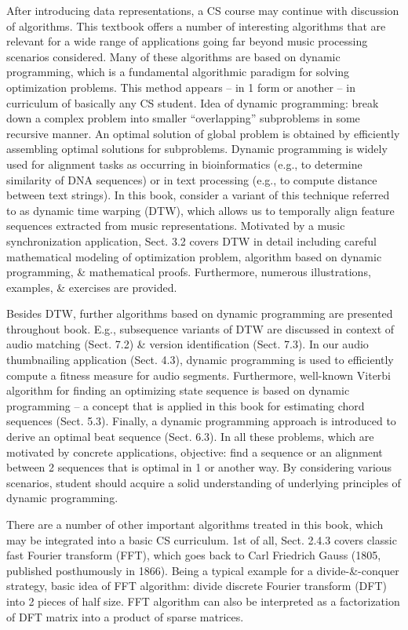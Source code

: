 \documentclass{article}
\begin{document}
\begin{itemize}
\begin{itemize}
		After introducing data representations, a CS course may continue with discussion of algorithms. This textbook offers a number of interesting algorithms that are relevant for a wide range of applications going far beyond music processing scenarios considered. Many of these algorithms are based on dynamic programming, which is a fundamental algorithmic paradigm for solving optimization problems. This method appears -- in 1 form or another -- in curriculum of basically any CS student. Idea of dynamic programming: break down a complex problem into smaller ``overlapping'' subproblems in some recursive manner. An optimal solution of global problem is obtained by efficiently assembling optimal solutions for subproblems. Dynamic programming is widely used for alignment tasks as occurring in bioinformatics (e.g., to determine similarity of DNA sequences) or in text processing (e.g., to compute distance between text strings). In this book, consider a variant of this technique referred to as dynamic time warping (DTW), which allows us to temporally align feature sequences extracted from music representations. Motivated by a music synchronization application, Sect. 3.2 covers DTW in detail including careful mathematical modeling of optimization problem, algorithm based on dynamic programming, \& mathematical proofs. Furthermore, numerous illustrations, examples, \& exercises are provided.
		
		Besides DTW, further algorithms based on dynamic programming are presented throughout book. E.g., subsequence variants of DTW are discussed in context of audio matching (Sect. 7.2) \& version identification (Sect. 7.3). In our audio thumbnailing application (Sect. 4.3), dynamic programming is used to efficiently compute a fitness measure for audio segments. Furthermore, well-known Viterbi algorithm for finding an optimizing state sequence is based on dynamic programming -- a concept that is applied in this book for estimating chord sequences (Sect. 5.3). Finally, a dynamic programming approach is introduced to derive an optimal beat sequence (Sect. 6.3). In all these problems, which are motivated by concrete applications, objective: find a sequence or an alignment between 2 sequences that is optimal in 1 or another way. By considering various scenarios, student should acquire a solid understanding of underlying principles of dynamic programming.
		
		There are a number of other important algorithms treated in this book, which may be integrated into a basic CS curriculum. 1st of all, Sect. 2.4.3 covers classic fast Fourier transform (FFT), which goes back to {\sc Carl Friedrich Gauss} (1805, published posthumously in 1866). Being a typical example for a divide-\&-conquer strategy, basic idea of FFT algorithm: divide discrete Fourier transform (DFT) into 2 pieces of half size. FFT algorithm can also be interpreted as a factorization of DFT matrix into a product of sparse matrices.
		

\end{itemize}
\end{itemize}
\end{document}
